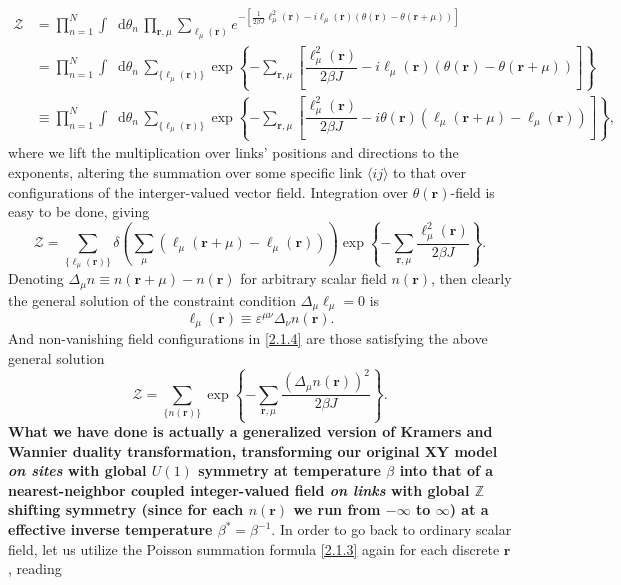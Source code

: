 \documentclass[10pt,nofootinbib]{revtex4}
\newcommand*\dd{\mathop{}\!\mathrm{d}}
\def\Z{\mathcal{Z}}
\begin{document}
		\begin{align*}
			\Z&=\prod_{n=1}^N\int\dd\theta_n\,\prod_{\bm{r},\mu}\sum_{\ell_\mu(\bm{r})}e^{-[\frac{1}{2\beta J}\ell_\mu^2(\bm{r})-i\ell_\mu(\bm{r})(\theta(\bm{r})-\theta(\bm{r}+\mu))]}\\
			&=\prod_{n=1}^N\int\dd\theta_n\,\sum_{\{\ell_\mu(\bm{r})\}}\exp \left\{-\sum_{\bm{r},\mu}\left[\dfrac{\ell_\mu^2(\bm{r})}{2\beta J}-i\ell_\mu(\bm{r})(\theta(\bm{r})-\theta(\bm{r}+\mu))\right] \right\}\\
			&\equiv\prod_{n=1}^N\int\dd\theta_n\,\sum_{\{\ell_\mu(\bm{r})\}}\exp \left\{-\sum_{\bm{r},\mu}\left[\dfrac{\ell_\mu^2(\bm{r})}{2\beta J}-i\theta(\bm{r})(\ell_\mu(\bm{r}+\mu)-\ell_\mu(\bm{r}))\right] \right\},
		\end{align*}
		where we lift the multiplication over links' positions and directions to the exponents, altering the summation over some specific link $\langle ij \rangle$ to that over configurations of the interger-valued vector field. Integration over $\theta(\bm{r})$-field is easy to be done, giving
		\begin{equation}\label{2.1.4}
			\Z=\sum_{\{\ell_\mu(\bm{r})\}}\delta\left(\sum_\mu(\ell_\mu(\bm{r}+\mu)-\ell_\mu(\bm{r}))\right)\exp\left\{-\sum_{\bm{r},\mu}\dfrac{\ell_\mu^2(\bm{r})}{2\beta J}\right\}.
		\end{equation}
		Denoting $\Delta_\mu n\equiv n(\bm{r}+\mu)-n(\bm{r})$ for arbitrary scalar field $n(\bm{r})$, then clearly the general solution of the constraint condition $\Delta_\mu\ell_\mu=0$ is
		\begin{equation*}
			\ell_\mu(\bm{r})\equiv \varepsilon^{\mu\nu}\Delta_\nu n(\bm{r}).
		\end{equation*}
		And non-vanishing field configurations in \eqref{2.1.4} are those satisfying the above general solution
		\begin{equation}\label{2.1.5}
			\Z=\sum_{\{n(\bm{r})\}}\exp\left\{-\sum_{\bm{r},\mu}\dfrac{(\Delta_\mu n(\bm{r}))^2}{2\beta J}\right\}.
		\end{equation}
		\indent \textbf{\color{red}What we have done is actually a generalized version of Kramers and Wannier duality transformation, transforming our original XY model \emph{on sites} with global $U(1)$ symmetry at temperature $\beta$ into that of a nearest-neighbor coupled integer-valued field \emph{on links} with global $\mathbb{Z}$ shifting symmetry (since for each $n(\bm{r})$ we run from $-\infty$ to $\infty$) at a effective inverse temperature $\beta^*=\beta^{-1}$}. In order to go back to ordinary scalar field, let us utilize the Poisson summation formula \eqref{2.1.3} again for each discrete $\bm{r}$, reading
\end{document}
